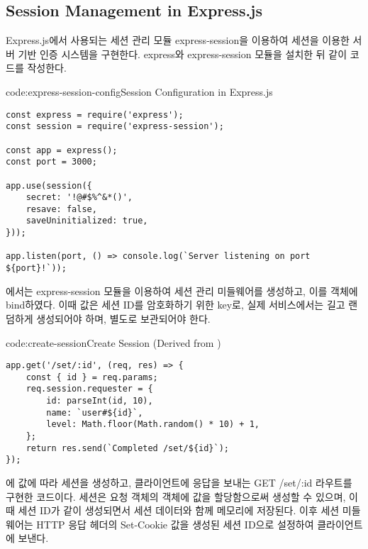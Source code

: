 
\subsection*{Session Management in Express.js}

Express.js에서 사용되는 세션 관리 모듈 express-session을 이용하여 세션을 이용한 서버 기반 인증 시스템을 구현한다. express와 express-session 모듈을 설치한 뒤 \와 같이 코드를 작성한다.

\begin{code}{code:express-session-config}{Session Configuration in Express.js}
\begin{verbatim}
const express = require('express');
const session = require('express-session');

const app = express();
const port = 3000;

app.use(session({
    secret: '!@#$%^&*()',
    resave: false,
    saveUninitialized: true,
}));

app.listen(port, () => console.log(`Server listening on port ${port}!`));
\end{verbatim}
\end{code}

에서는 express-session 모듈을 이용하여 세션 관리 미들웨어를 생성하고, 이를  객체에 bind하였다. 이때  값은 세션 ID를 암호화하기 위한 key로, 실제 서비스에서는 길고 랜덤하게 생성되어야 하며, 별도로 보관되어야 한다.

\begin{code}{code:create-session}{Create Session (Derived from )}
\begin{verbatim}
app.get('/set/:id', (req, res) => {
    const { id } = req.params;
    req.session.requester = {
        id: parseInt(id, 10),
        name: `user#${id}`,
        level: Math.floor(Math.random() * 10) + 1,
    };
    return res.send(`Completed /set/${id}`);
});
\end{verbatim}
\end{code}

\은 에  값에 따라 세션을 생성하고, 클라이언트에 응답을 보내는 GET /set/:id 라우트를 구현한 코드이다. 세션은 요청 객체의  객체에 값을 할당함으로써 생성할 수 있으며, 이때 세션 ID가 같이 생성되면서 세션 데이터와 함께 메모리에 저장된다. 이후 세션 미들웨어는 HTTP 응답 헤더의 Set-Cookie 값을 생성된 세션 ID으로 설정하여 클라이언트에 보낸다.


